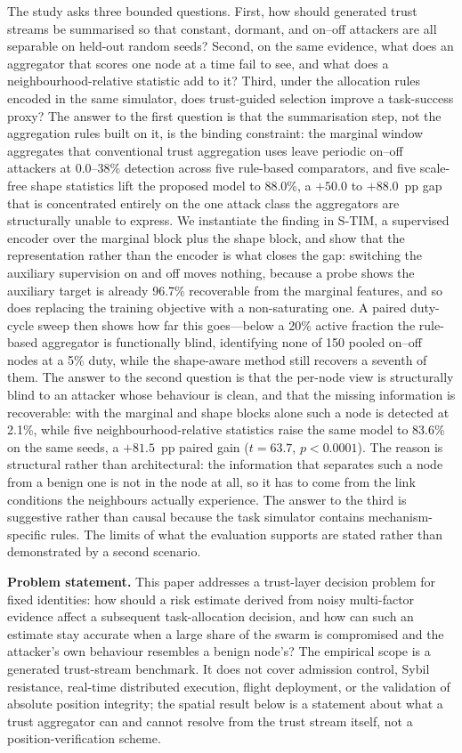 \documentclass[notspecified,article,submit,moreauthors]{Definitions/mdpi}
\begin{document}
The study asks three bounded questions. First, how should generated trust streams be summarised so that constant, dormant, and on--off attackers are all separable on held-out random seeds? Second, on the same evidence, what does an aggregator that scores one node at a time fail to see, and what does a neighbourhood-relative statistic add to it? Third, under the allocation rules encoded in the same simulator, does trust-guided selection improve a task-success proxy? The answer to the first question is that the summarisation step, not the aggregation rules built on it, is the binding constraint: the marginal window aggregates that conventional trust aggregation uses leave periodic on--off attackers at 0.0--38\% detection across five rule-based comparators, and five scale-free shape statistics lift the proposed model to 88.0\%, a $+50.0$ to $+88.0$~pp gap that is concentrated entirely on the one attack class the aggregators are structurally unable to express. We instantiate the finding in S-TIM, a supervised encoder over the marginal block plus the shape block, and show that the representation rather than the encoder is what closes the gap: switching the auxiliary supervision on and off moves nothing, because a probe shows the auxiliary target is already 96.7\% recoverable from the marginal features, and so does replacing the training objective with a non-saturating one. A paired duty-cycle sweep then shows how far this goes---below a 20\% active fraction the rule-based aggregator is functionally blind, identifying none of 150 pooled on--off nodes at a 5\% duty, while the shape-aware method still recovers a seventh of them. The answer to the second question is that the per-node view is structurally blind to an attacker whose behaviour is clean, and that the missing information is recoverable: with the marginal and shape blocks alone such a node is detected at 2.1\%, while five neighbourhood-relative statistics raise the same model to 83.6\% on the same seeds, a $+81.5$~pp paired gain ($t=63.7$, $p<0.0001$). The reason is structural rather than architectural: the information that separates such a node from a benign one is not in the node at all, so it has to come from the link conditions the neighbours actually experience. The answer to the third is suggestive rather than causal because the task simulator contains mechanism-specific rules. The limits of what the evaluation supports are stated rather than demonstrated by a second scenario.

\textbf{Problem statement.}
This paper addresses a trust-layer decision problem for fixed identities: how should a risk estimate derived from noisy multi-factor evidence affect a subsequent task-allocation decision, and how can such an estimate stay accurate when a large share of the swarm is compromised and the attacker's own behaviour resembles a benign node's? The empirical scope is a generated trust-stream benchmark. It does not cover admission control, Sybil resistance, real-time distributed execution, flight deployment, or the validation of absolute position integrity; the spatial result below is a statement about what a trust aggregator can and cannot resolve from the trust stream itself, not a position-verification scheme.
\end{document}
